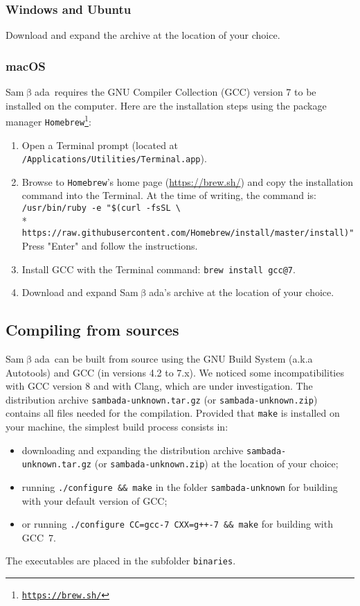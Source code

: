 \documentclass[a4paper,11pt]{article}
\newcommand{\versionnumber}{unknown}
\newcommand{\smb}{\textsf{Sam$\upbeta$ada}}
\newcommand{\prog}[1]{\texttt{#1}}
\begin{document}
\subsubsection*{Windows and Ubuntu}
Download and expand the archive at the location of your choice.

\subsubsection*{macOS}
\smb\ requires the GNU Compiler Collection (GCC) version 7 to be installed on the computer.
Here are the installation steps using the package manager  \prog{Homebrew\footnote{\url{https://brew.sh/}}}:
\begin{enumerate}
\item{Open a Terminal prompt (located at \prog{/Applications/Utilities/Terminal.app}).}
\item{Browse to \prog{Homebrew}'s home page (\url{https://brew.sh/}) and copy the installation command into the Terminal.
At the time of writing, the command is: \\
\verb+/usr/bin/ruby -e "$(curl -fsSL \+ \\*
\verb+https://raw.githubusercontent.com/Homebrew/install/master/install)"+
Press "Enter" and follow the instructions.}
\item{Install GCC with the Terminal command: \prog{brew install gcc@7}.}
\item{Download and expand \smb's archive at the location of your choice.}
\end{enumerate}

\subsection*{Compiling from sources}
\smb\ can be built from source using the GNU Build System (a.k.a Autotools) and GCC (in versions 4.2 to 7.x).
We noticed some incompatibilities with GCC version 8 and with Clang, which are under investigation.
The distribution archive \prog{sambada-\versionnumber.tar.gz} (or \prog{sambada-\versionnumber.zip}) contains all files needed for the compilation. 
Provided that \prog{make} is installed on your machine, the simplest build process consists in:
\begin{itemize}
\item{downloading and expanding the distribution archive \prog{sambada-\versionnumber.tar.gz} (or \prog{sambada-\versionnumber.zip}) at the location of your choice;} 
\item{running \prog{./configure \&\& make} in the folder \prog{sambada-\versionnumber} for building with your default version of GCC;}
\item{or running \prog{./configure CC=gcc-7 CXX=g++-7 \&\& make} for building with GCC~7.}
\end{itemize}
The executables are placed in the subfolder \prog{binaries}.
\end{document}
